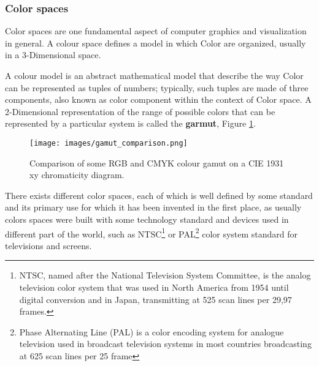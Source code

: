 \documentclass[12pt,a4paper]{extarticle}
\newcommand{\linespace}{\vspace{8pt}}
\begin{document}
\subsubsection{Color spaces} %
Color spaces are one fundamental aspect of computer graphics and visualization in general. A colour space defines a model in which Color are organized, usually in a 3-Dimensional space.
\linespace

A colour model is an abstract mathematical model that describe the way Color can be represented as tuples of numbers; typically, such tuples are made of three components, also known as color component within the context of Color space.
A 2-Dimensional representation of the range of possible colors that can be represented by a particular system is called the \textbf{garmut}, Figure \ref{fig:gamut}.

\begin{figure}[hbtp]
\centering
\texttt{[image: images/gamut\_comparison.png]}
\caption{Comparison of some RGB and CMYK colour gamut on a CIE 1931 xy chromaticity diagram.} %
\label{fig:gamut}
\end{figure}


There exists different color spaces, each of which is well defined by some standard and its primary use for which it has been invented in the first place, as usually colors spaces were built with some technology standard and devices used in different part of the world, such as NTSC\footnote{NTSC, named after the National Television System Committee, is the analog television color system that was used in North America from 1954 until digital conversion and in Japan, transmitting at 525 scan lines per 29,97 frames.} %
 or PAL\footnote{Phase Alternating Line (PAL) is a color encoding system for analogue television used in broadcast television systems in most countries broadcasting at 625 scan lines per 25 frame}
  color system standard for televisions and screens.
\linespace
\end{document}
